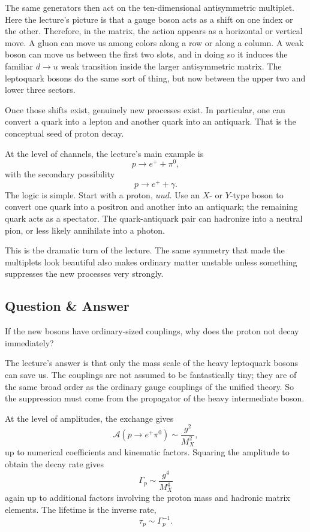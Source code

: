 The same generators then act on the ten-dimensional antisymmetric multiplet. Here the lecture's picture is that a gauge boson acts as a shift on one index or the other. Therefore, in the matrix, the action appears as a horizontal or vertical move. A gluon can move us among colors along a row or along a column. A weak boson can move us between the first two slots, and in doing so it induces the familiar \(d\to u\) weak transition inside the larger antisymmetric matrix. The leptoquark bosons do the same sort of thing, but now between the upper two and lower three sectors.

Once those shifts exist, genuinely new processes exist. In particular, one can convert a quark into a lepton and another quark into an antiquark. That is the conceptual seed of proton decay.

At the level of channels, the lecture's main example is
\begin{equation}
p\to e^+ + \pi^0,
\end{equation}
with the secondary possibility
\begin{equation}
p\to e^+ + \gamma.
\end{equation}
The logic is simple. Start with a proton, \(uud\). Use an \(X\)- or \(Y\)-type boson to convert one quark into a positron and another into an antiquark; the remaining quark acts as a spectator. The quark-antiquark pair can hadronize into a neutral pion, or less likely annihilate into a photon.

This is the dramatic turn of the lecture. The same symmetry that made the multiplets look beautiful also makes ordinary matter unstable unless something suppresses the new processes very strongly.

\subsection{Question \& Answer}

If the new bosons have ordinary-sized couplings, why does the proton not decay immediately?

The lecture's answer is that only the mass scale of the heavy leptoquark bosons can save us. The couplings are not assumed to be fantastically tiny; they are of the same broad order as the ordinary gauge couplings of the unified theory. So the suppression must come from the propagator of the heavy intermediate boson.

At the level of amplitudes, the exchange gives
\begin{equation}
\mathcal A(p\to e^+\pi^0)\sim \frac{g^2}{M_X^2},
\end{equation}
up to numerical coefficients and kinematic factors. Squaring the amplitude to obtain the decay rate gives
\begin{equation}
\Gamma_p \sim \frac{g^4}{M_X^4}
\end{equation}
again up to additional factors involving the proton mass and hadronic matrix elements. The lifetime is the inverse rate,
\begin{equation}
\tau_p\sim \Gamma_p^{-1}.
\end{equation}

